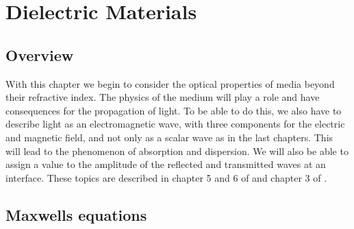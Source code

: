 \renewcommand{\lastmod}{November 24, 2023}
\renewcommand{\chapterauthors}{Markus Lippitz}

\chapter{Dielectric Materials}




\section{Overview}

With this chapter we begin to consider the optical properties of media beyond their refractive index. The physics of the medium will play a role and have consequences for the propagation of light. To be able to do this, we also have to describe light as an electromagnetic wave, with three components for the electric and magnetic field, and not only as a scalar wave as in the last chapters. This will lead to the phenomenon of absorption and dispersion. We will also be able to assign a value to the amplitude of the reflected and transmitted waves at an interface.  These topics are described in chapter 5 and 6 of \cite{SalehTeich1991} and chapter 3 of \cite{Hecht_Optics}.


\section{Maxwells equations}

